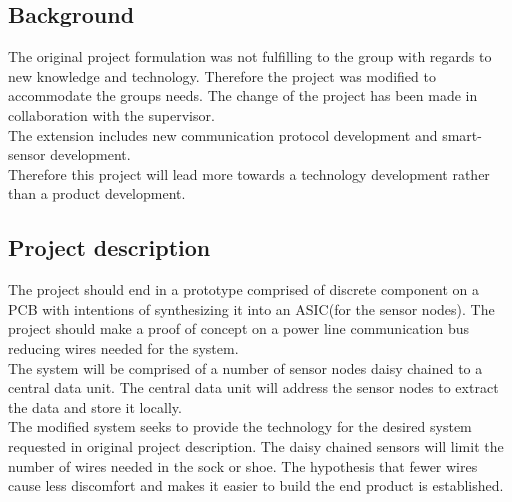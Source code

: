 \subsection{Background}
The original project formulation was not fulfilling to the group with regards to new knowledge and technology. Therefore the project was modified to accommodate the groups needs. The change of the project has been made in collaboration with the supervisor.\\
The extension includes new communication protocol development and smart-sensor development.\\
Therefore this project will lead more towards a technology development rather than a product development.\\

\subsection{Project description}
The project should end in a prototype comprised of discrete component on a PCB with intentions of synthesizing it into an ASIC(for the sensor nodes). The project should make a proof of concept on a power line communication bus reducing wires needed for the system.\\
The system will be comprised of a number of sensor nodes daisy chained to a central data unit. The central data unit will address the sensor nodes to extract the data and store it locally.\\
The modified system seeks to provide the technology for the desired system requested in original project description. The daisy chained sensors will limit the number of wires needed in the sock or shoe. The hypothesis that fewer wires cause less discomfort and makes it easier to build the end product is established.\\

